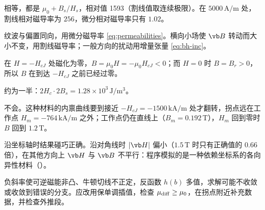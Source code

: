 \begin{answers}
\item 相等，都是 $\mu_0+B_s/H_s$，相对值 1593（割线值取连续极限）。在 $5000\,\mathrm{A/m}$ 处，割线相对磁导率为 $256$，微分相对磁导率只有 $1.02$。
\item 纹波与偏置同向，用微分磁导率 \eqref{eq:permeabilities}。横向小场使 $\vb B$ 转动而大小不变，用割线磁导率；一般方向的扰动用增量张量 \eqref{eq:bh-inc}。
\item 在 $H=-H_{cJ}$ 处磁化为零，$B=\mu_0H=-\mu_0H_{cJ}<0$；而 $H=0$ 时 $B=B_r>0$，所以 $B$ 在到达 $-H_{cJ}$ 之前已经过零。
\item 约为一半：$2H_c\cdot2B_s=1.28\times10^3\,\mathrm{J/m^3}$。
\item 不会。这种材料的内禀曲线要到接近 $-H_{cJ}=-1500\,\mathrm{kA/m}$ 处才翻转，拐点远在工作点 $H_m=-764\,\mathrm{kA/m}$ 之外；工作点仍在直线上（$B_m=0.192\,\mathrm T$），$H_m$ 回到零时 $B$ 回到 $1.2\,\mathrm T$。
\item 沿坐标轴时结果碰巧正确。沿对角线时 $|\vb H|$ 偏小（$1.5\,\mathrm T$ 时只有正确值的 $0.66$ 倍），在其他方向上 $\vb H$ 与 $\vb B$ 不平行：程序模拟的是一种依赖坐标系的各向异性材料（）。
\item 负斜率使可逆磁能非凸、牛顿切线不正定，反函数 $h(b)$ 多值，求解可能不收敛或收敛到错误的分支。应改用保单调插值，检查 $\mu_{\rm diff}\ge\mu_0$，在拐点附近补充数据，并检查外推段。
\end{answers}
